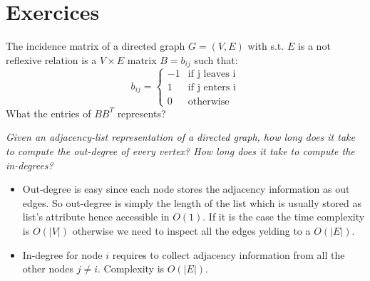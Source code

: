\section{Exercices}

\begin{problem}
The incidence matrix of a directed graph $G=(V,E)$ with s.t. $E$ is a not reflexive relation  is a
$V \times E$ matrix $B = b_{ij}$ such that:
\[
    b_{ij}=\left\{
                \begin{array}{ll}
                  -1 &\text{if j leaves i}\\
                  1 &\text{if j enters i}\\
                  0 &\text{otherwise}
                \end{array}
              \right.
  \]
What the entries of $BB^T$ represents?

	\begin{solution}
	
	\end{solution}
\end{problem}





\begin{problem}
\textit{Given an adjacency-list representation of a directed graph, how long does it take
to compute the out-degree of every vertex? How long does it take to compute the
in-degrees?}

	\begin{solution}
\begin{itemize}
\item Out-degree is easy since each node stores the adjacency information as out edges. So out-degree is simply the length of the list which is usually stored as list's attribute hence accessible in $O(1)$. If it 
is the case the time complexity is $O(|V|)$ otherwise we need to inspect all the edges yelding to a $O(|E|)$. 
\item In-degree for node $i$ requires to collect adjacency information from all the other nodes $j \neq i$. Complexity is $O(|E|)$.
\end{itemize}

	\end{solution}
\end{problem}




